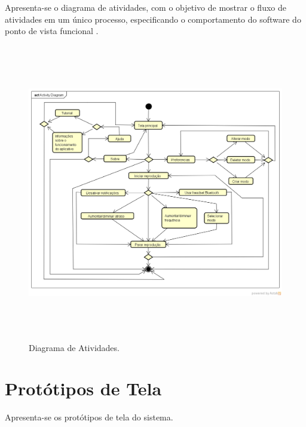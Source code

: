 Apresenta-se o diagrama de atividades, com o objetivo de mostrar o fluxo de atividades em um \'unico processo, especificando o comportamento do software do ponto de vista funcional \cite{Ventura2016a}. 
\begin{figure}[H]
	\centering
	\caption[Diagrama de Atividades]{Diagrama de Atividades. \label{fig:diagramadeatividades}}
	\includegraphics[height=13cm]{./Figuras/activity_diagram.png}%
\end{figure}

\section{Prot\'otipos de Tela}

Apresenta-se os prot\'otipos de tela do sistema. 

